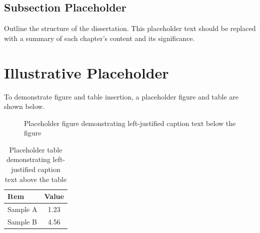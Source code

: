 \subsection{Subsection Placeholder}
Outline the structure of the dissertation. This placeholder text should be replaced with a summary of each chapter's content and its significance.
\newpage

\section{Illustrative Placeholder}
To demonstrate figure and table insertion, a placeholder figure and table are shown below.

\begin{figure}[htbp]
  \centering
  \caption{Placeholder figure demonstrating left-justified caption text below the figure} %
  \label{fig:placeholder}
\end{figure}


\begin{table}[htbp]
  \caption{Placeholder table demonstrating left-justified caption text above the table} %
  \label{tab:placeholder}
  \centering
  \begin{tabular}{lc}
    \toprule
    Item & Value \\
    \midrule
    Sample A & 1.23 \\
    Sample B & 4.56 \\
    \bottomrule
  \end{tabular}

\end{table}
